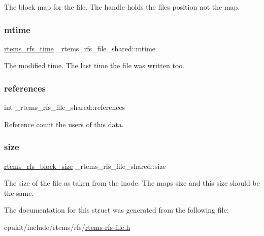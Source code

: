 The block map for the file. The handle holds the file\textquotesingle{}s position not the map. \mbox{\label{struct__rtems__rfs__file__shared_abd80b3c44c16145f2f82c6ca5cce6f50}} 
\subsubsection{\texorpdfstring{mtime}{mtime}}
{\footnotesize\ttfamily \mbox{\hyperlink{rtems-rfs-inode_8h_a7877cc60240d76cccb89acaffdd20aa6}{rtems\+\_\+rfs\+\_\+time}} \+\_\+rtems\+\_\+rfs\+\_\+file\+\_\+shared\+::mtime}

The modified time. The last time the file was written too. \mbox{\label{struct__rtems__rfs__file__shared_a7c0a1d1b43b6a47eb72ca556fc34e43f}} 
\subsubsection{\texorpdfstring{references}{references}}
{\footnotesize\ttfamily int \+\_\+rtems\+\_\+rfs\+\_\+file\+\_\+shared\+::references}

Reference count the users of this data. \mbox{\label{struct__rtems__rfs__file__shared_a9e560fbf0582c82fa673e31dd9bbb49f}} 
\subsubsection{\texorpdfstring{size}{size}}
{\footnotesize\ttfamily \mbox{\hyperlink{rtems-rfs-block-pos_8h_aa72438eee22908110dc633ca6b89b390}{rtems\+\_\+rfs\+\_\+block\+\_\+size}} \+\_\+rtems\+\_\+rfs\+\_\+file\+\_\+shared\+::size}

The size of the file as taken from the inode. The map\textquotesingle{}s size and this size should be the same. 

The documentation for this struct was generated from the following file\+:\begin{DoxyCompactItemize}
\item 
cpukit/include/rtems/rfs/\mbox{\hyperlink{rtems-rfs-file_8h}{rtems-\/rfs-\/file.\+h}}\end{DoxyCompactItemize}
